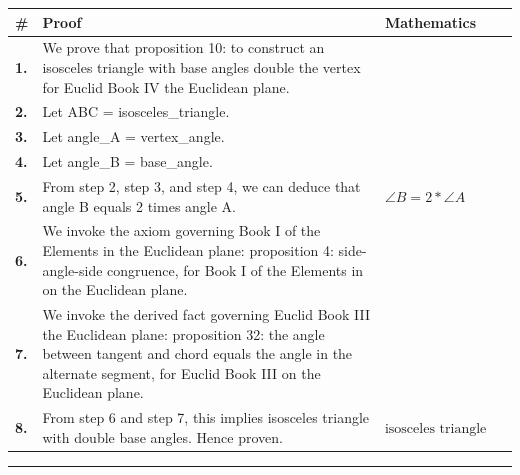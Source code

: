 \documentclass[11pt]{article}
\theoremstyle{definition}
\begin{document}
\begin{tabular}{@{} >{\raggedright\arraybackslash}p{} >{\raggedright\arraybackslash}p{} >{\raggedleft\arraybackslash}p{} @{}}
\textbf{\#} & \textbf{Proof} & \textbf{Mathematics} \\
\midrule
\textbf{1.} & We prove that proposition 10: to construct an isosceles triangle with base angles double the vertex for Euclid Book IV the Euclidean plane. & \\[0.45em]
\textbf{2.} & Let ABC = isosceles\_triangle. & \\[0.45em]
\textbf{3.} & Let angle\_A = vertex\_angle. & \\[0.45em]
\textbf{4.} & Let angle\_B = base\_angle. & \\[0.45em]
\textbf{5.} & From step 2, step 3, and step 4, we can deduce that angle B equals 2 times angle A. & $\displaystyle \angle B = 2 * \angle A$ \\[0.45em]
\textbf{6.} & We invoke the axiom governing Book I of the Elements in the Euclidean plane: proposition 4: side-angle-side congruence, for Book I of the Elements in on the Euclidean plane. & \\[0.45em]
\textbf{7.} & We invoke the derived fact governing Euclid Book III the Euclidean plane: proposition 32: the angle between tangent and chord equals the angle in the alternate segment, for Euclid Book III on the Euclidean plane. & \\[0.45em]
\textbf{8.} & From step 6 and step 7, this implies isosceles triangle with double base angles. Hence proven. & $\displaystyle \text{isosceles triangle with double base angles}$ \\[0.45em]
\bottomrule
\end{tabular}
\label{thm:Geometry-Euclid Book IV-proposition_10_to_construct_an_isosceles_triangle_with_base_angles_double_the_vertex}
\par\medskip\hrule
\end{document}
